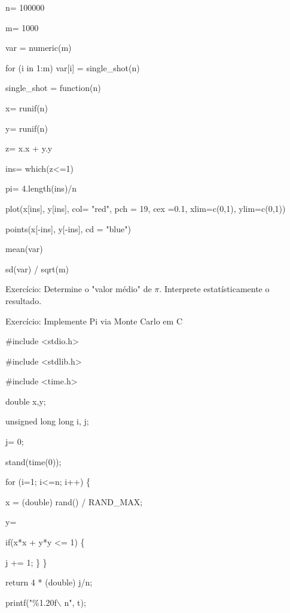 \documentclass[a4paper, 12pt]{article}
\begin{document}
    n= 100000 \newline
    
    m= 1000
    
    var = numeric(m)
    
    for (i in 1:m) var[i] = single\_shot(n)
    
    single\_shot = function(n) \newline
    
    x= runif(n)
    
    y= runif(n)
    
    z= x.x + y.y
    
    ins= which(z<=1)
    
    pi= 4.length(ins)/n \newline
    
    plot(x[ins], y[ins], col= "red", pch = 19, cex =0.1, xlim=c(0,1), ylim=c(0,1))
    
    points(x[-ins], y[-ins], cd = "blue") \newline
    
    mean(var)
    
    sd(var) / sqrt(m) \newline
    
    Exercício: Determine o "valor médio" de $\pi$. Interprete estatísticamente o resultado. \newline
    
    Exercício: Implemente Pi via Monte Carlo em C \newline
    
    \#include <stdio.h> 
    
    \#include <stdlib.h> 
    
    \#include <time.h> \newline
    
    double x,y; \newline
    
    unsigned long long i, j; \newline
    
    j= 0; \newline
    
    stand(time(0)); \newline
    
    for (i=1; i<=n; i++) \{
    
    x = (double) rand() / RAND\_MAX;
    
    y= \newline
    
    if(x*x + y*y <= 1) \{
    
    j += 1;
    \} \newline
    \} \newline
    
    return 4 * (double) j/n; \newline
    
    printf("\%1.20f$\backslash$ n", t);
\end{document}
